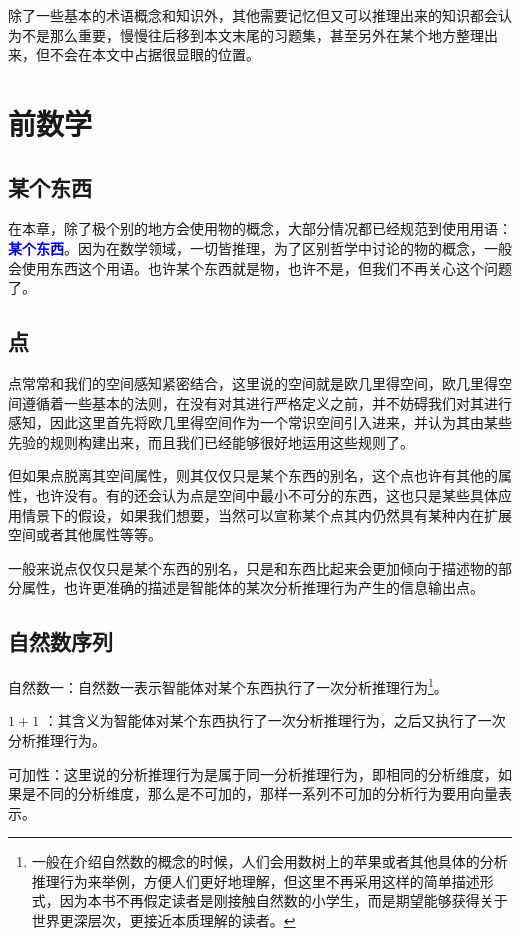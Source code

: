 \documentclass[12pt,oneside]{book}
\renewcommand{\emph}[1]{\textcolor{blue}{\textbf{#1}}}
\begin{document}
除了一些基本的术语概念和知识外，其他需要记忆但又可以推理出来的知识都会认为不是那么重要，慢慢往后移到本文末尾的习题集，甚至另外在某个地方整理出来，但不会在本文中占据很显眼的位置。


\chapter{前数学}
\section{某个东西}
在本章，除了极个别的地方会使用物的概念，大部分情况都已经规范到使用用语：\emph{某个东西}。因为在数学领域，一切皆推理，为了区别哲学中讨论的物的概念，一般会使用东西这个用语。也许某个东西就是物，也许不是，但我们不再关心这个问题了。

\section{点}
点常常和我们的空间感知紧密结合，这里说的空间就是欧几里得空间，欧几里得空间遵循着一些基本的法则，在没有对其进行严格定义之前，并不妨碍我们对其进行感知，因此这里首先将欧几里得空间作为一个常识空间引入进来，并认为其由某些先验的规则构建出来，而且我们已经能够很好地运用这些规则了。

但如果点脱离其空间属性，则其仅仅只是某个东西的别名，这个点也许有其他的属性，也许没有。有的还会认为点是空间中最小不可分的东西，这也只是某些具体应用情景下的假设，如果我们想要，当然可以宣称某个点其内仍然具有某种内在扩展空间或者其他属性等等。

一般来说点仅仅只是某个东西的别名，只是和东西比起来会更加倾向于描述物的部分属性，也许更准确的描述是智能体的某次分析推理行为产生的信息输出点。

\section{自然数序列}
自然数一：自然数一表示智能体对某个东西执行了一次分析推理行为\footnote{一般在介绍自然数的概念的时候，人们会用数树上的苹果或者其他具体的分析推理行为来举例，方便人们更好地理解，但这里不再采用这样的简单描述形式，因为本书不再假定读者是刚接触自然数的小学生，而是期望能够获得关于世界更深层次，更接近本质理解的读者。}。

$1+1$ ：其含义为智能体对某个东西执行了一次分析推理行为，之后又执行了一次分析推理行为。

可加性：这里说的分析推理行为是属于同一分析推理行为，即相同的分析维度，如果是不同的分析维度，那么是不可加的，那样一系列不可加的分析行为要用向量表示。
\end{document}
